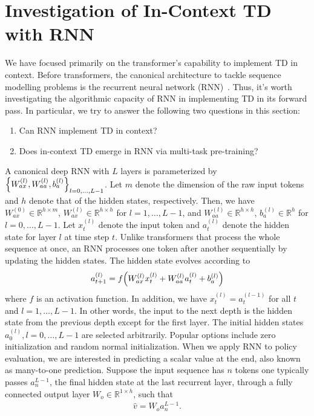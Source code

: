 \documentclass{article}
\newcommand{\R}{\mathbb{R}}
\begin{document}
\section{Investigation of In-Context TD with RNN}
We have focused primarily on the transformer's capability to implement TD in context.
Before transformers, the canonical architecture to tackle sequence modelling problems is the recurrent neural network (RNN)~\citep{ elman1990finding, bengio2017deep}.
Thus, it's worth investigating the algorithmic capacity of RNN in implementing TD in its forward pass.
In particular, we try to answer the following two questions in this section:
\begin{enumerate}
    \item Can RNN implement TD in context? \label{question: rnn can}
    \item Does in-context TD emerge in RNN via multi-task pre-training? \label{question: rnn do}
\end{enumerate}
A canonical deep RNN with $L$ layers is parameterized by $\qty{W_{ax}^{(l)}, W_{aa}^{(l)}, b^{(l)}_{a}}_{l=0,\dots,L-1}$.
Let $m$ denote the dimension of the raw input tokens and $h$ denote that of the hidden states, respectively.
Then, we have $W_{ax}^{(0)} \in \R^{h\times m}$, $W_{ax}^{(l)} \in \R^{h\times h}$ for $l= 1, \dots, L-1$, and $ W_{aa}^{(l)} \in \R^{h\times h}$, $ b^{(l)}_a \in \R^h$ for $l=0,\dots,L-1$.
Let $x_t^{(l)}$ denote the input token and $a_t^{(l)}$ denote the hidden state for layer $l$ at time step $t$.
Unlike transformers that process the whole sequence at once, an RNN processes one token after another sequentially by updating the hidden states.
The hidden state evolves according to
\begin{align}
    a_{t+1}^{(l)} = f\qty(W_{ax}^{(l)}x_t^{(l)} + W_{aa}^{(l)}a_t^{(l)} + b_a^{(l)})
\end{align}
where $f$ is an activation function.
In addition, we have $x_t^{(l)} = a_t^{(l-1)}$ for all $t$ and $l = 1,\dots, L-1$.
In other words, the input to the next depth is the hidden state from the previous depth except for the first layer.
The initial hidden states $a_0^{(l)}, l = 0, \dots, L-1$ are selected arbitrarily.
Popular options include zero initialization and random normal initialization.
When we apply RNN to policy evaluation, we are interested in predicting a scalar value at the end, also known as many-to-one prediction.
Suppose the input sequence has $n$ tokens one typically passes $a_n^{L-1}$, the final hidden state at the last recurrent layer, through a fully connected output layer $W_o \in \R^{1 \times h}$, such that
\begin{align}
    \hat{v} = W_o a_n^{L-1}.
\end{align}
\end{document}
